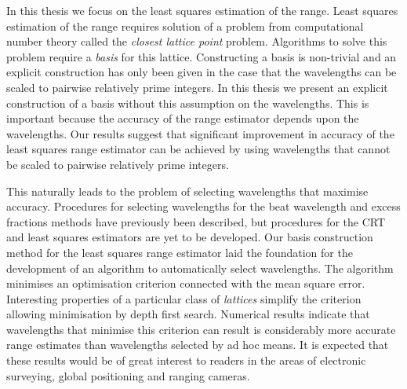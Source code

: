 In this thesis we focus on the least squares estimation of the range. Least squares estimation of the range requires solution of a problem from computational number theory called the \emph{closest lattice point} problem.  Algorithms to solve this problem require a \emph{basis} for this lattice.  Constructing a basis is non-trivial and an explicit construction has only been given in the case that the wavelengths can be scaled to pairwise relatively prime integers.  In this thesis we present an explicit construction of a basis without this assumption on the wavelengths.  This is important because the accuracy of the range estimator depends upon the wavelengths.  Our results suggest that significant improvement in accuracy of the least squares range estimator can be achieved by using wavelengths that cannot be scaled to pairwise relatively prime integers.
 
This naturally leads to the problem of selecting wavelengths that maximise accuracy.  Procedures for selecting wavelengths for the beat wavelength and excess fractions methods have previously been described, but procedures for the CRT and least squares estimators are yet to be developed.  Our basis construction method for the least squares range estimator laid the foundation for the development of an algorithm to automatically select wavelengths. The algorithm minimises an optimisation criterion connected with the mean square error. Interesting properties of a particular class of \emph{lattices} simplify the criterion allowing minimisation by depth first search.  Numerical results indicate that wavelengths that minimise this criterion can result is considerably more accurate range estimates than wavelengths selected by ad hoc means. It is expected that these results would be of great interest to readers in the areas of electronic surveying, global positioning and ranging cameras. 